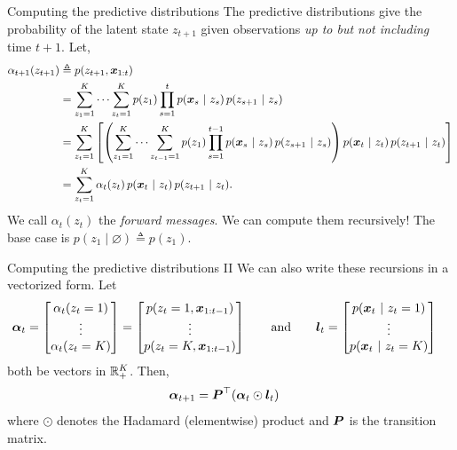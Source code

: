 \documentclass[aspectratio=169]{beamer}
\begin{document}
\begin{frame}{Computing the predictive distributions}
    The predictive distributions give the probability of the latent state $z_{t+1}$ given observations \textit{up to but not including} time $t+1$.
    Let,
    \begin{align}
        \alpha_{t+1}(z_{t+1}) &\triangleq p(z_{t+1}, \boldsymbol{x}_{1:t}) \\
        &= \sum_{z_1=1}^K \cdots \sum_{z_{t}=1}^K p(z_1) \prod_{s=1}^{t} p(\boldsymbol{x}_s ~\vert~ z_s) \, p(z_{s+1} ~\vert~ z_{s})\\
        &= \sum_{z_{t}=1}^K \left[ \left( \sum_{z_1=1}^K \cdots \sum_{z_{t-1}=1}^K p(z_1) \prod_{s=1}^{t-1} p(\boldsymbol{x}_s ~\vert~ z_s) \, p(z_{s+1} ~\vert~ z_{s}) \right) p(\boldsymbol{x}_t ~\vert~ z_t) \, p(z_{t+1} ~\vert~ z_{t}) \right]  \\
        &= \sum_{z_{t}=1}^K \alpha_t(z_t) \, p(\boldsymbol{x}_t ~\vert~ z_t) \, p(z_{t+1} ~\vert~ z_{t}).
    \end{align}
    We call $\alpha_t(z_t)$ the \textit{forward messages}. 
    We can compute them recursively! The base case is $p(z_1 \mid \varnothing) \triangleq p(z_1)$.
\end{frame}


\begin{frame}{Computing the predictive distributions II }
    We can also write these recursions in a vectorized form. Let 
    \begin{align}
        \boldsymbol{\alpha}_t &= 
        \begin{bmatrix}
        \alpha_t(z_t = 1) \\
        \vdots \\
        \alpha_t(z_t=K)
        \end{bmatrix}
        =
        \begin{bmatrix}
        p(z_t = 1, \boldsymbol{x}_{1:t-1}) \\
        \vdots \\
        p(z_t = K, \boldsymbol{x}_{1:t-1})
        \end{bmatrix}
        \qquad \text{and} \qquad
        \boldsymbol{l}_t = 
        \begin{bmatrix}
        p(\boldsymbol{x}_t ~\vert~ z_t = 1) \\
        \vdots \\
        p(\boldsymbol{x}_t ~\vert~ z_t = K)
        \end{bmatrix}
    \end{align}
    both be vectors in $\mathbb{R}_+^K$. Then,
    \begin{align}
        \boldsymbol{\alpha}_{t+1} &= \boldsymbol{P}^\top (\boldsymbol{\alpha}_t \odot \boldsymbol{l}_t)
    \end{align}
    where $\odot$ denotes the Hadamard (elementwise) product and $\boldsymbol{P}$ is the transition matrix.
\end{frame}
\end{document}
